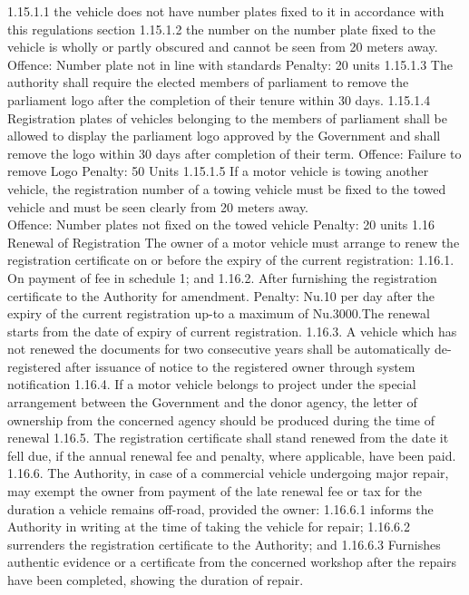 \documentclass[
]{book}
\begin{document}
\begin{enumerate}
  1.15.1.1 the vehicle does not have number plates fixed to it in accordance with this regulations section
  1.15.1.2 the number on the number plate fixed to the vehicle is wholly or partly obscured and cannot be seen from 20 meters away.
  Offence: Number plate not in line with standards
  Penalty: 20 units
  1.15.1.3 The authority shall require the elected members of parliament to remove the parliament logo after the completion of their tenure within 30 days.
  1.15.1.4 Registration plates of vehicles belonging to the members of parliament shall be allowed to display the parliament logo approved by the Government and shall remove the logo within 30 days after completion of their term.
  Offence: Failure to remove Logo
  Penalty: 50 Units
  1.15.1.5 If a motor vehicle is towing another vehicle, the registration number of a towing vehicle must be fixed to the towed vehicle and must be seen clearly from 20 meters away.\\
  Offence: Number plates not fixed on the towed vehicle
  Penalty: 20 units
  1.16 Renewal of Registration
  The owner of a motor vehicle must arrange to renew the registration certificate on or before the expiry of the current registration:
  1.16.1. On payment of fee in schedule 1; and
  1.16.2. After furnishing the registration certificate to the Authority for amendment.
  Penalty: Nu.10 per day after the expiry of the current registration up-to a maximum of Nu.3000.The renewal starts from the date of expiry of current registration.
  1.16.3. A vehicle which has not renewed the documents for two consecutive years shall be automatically de-registered after issuance of notice to the registered owner through system notification
  1.16.4. If a motor vehicle belongs to project under the special arrangement between the Government and the donor agency, the letter of ownership from the concerned agency should be produced during the time of renewal
  1.16.5. The registration certificate shall stand renewed from the date it fell due, if the annual renewal fee and penalty, where applicable, have been paid.
  1.16.6. The Authority, in case of a commercial vehicle undergoing major repair, may exempt the owner from payment of the late renewal fee or tax for the duration a vehicle remains off-road, provided the owner:
  1.16.6.1 informs the Authority in writing at the time of taking the vehicle for repair;
  1.16.6.2 surrenders the registration certificate to the Authority; and
  1.16.6.3 Furnishes authentic evidence or a certificate from the concerned workshop after the repairs have been completed, showing the duration of repair.

\end{enumerate}
\end{document}
